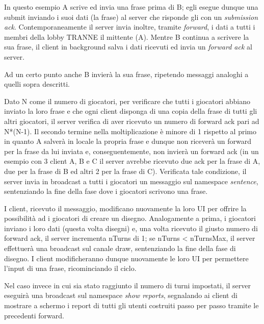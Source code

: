 \noindent In questo esempio A scrive ed invia una frase prima di B; egli esegue dunque una submit inviando i suoi dati (la frase) al server che risponde gli con un \textit{submission ack}. Contemporaneamente il server invia inoltre, tramite \textit{forward}, i dati a tutti i membri della lobby TRANNE il mittente (A). Mentre B continua a scrivere la sua frase, il client in background salva i dati ricevuti ed invia un \textit{forward ack} al server.\newline

\noindent Ad un certo punto anche B invierà la sua frase, ripetendo messaggi analoghi a quelli sopra descritti.\newline

\noindent Dato N come il numero di giocatori, per verificare che tutti i giocatori abbiano inviato la loro frase e che ogni client disponga di una copia della frase di tutti gli altri giocatori, il server verifica di aver ricevuto un numero di forward ack pari ad N*(N-1).\newline
Il secondo termine nella moltiplicazione è minore di 1 rispetto al primo in quanto A salverà in locale la propria frase e dunque non riceverà un forward per la frase da lui inviata e, conseguentemente, non invierà un forward ack (in un esempio con 3 client A, B e C il server avrebbe ricevuto due ack per la frase di A, due per la frase di B ed altri 2 per la frase di C).\newline
Verificata tale condizione, il server invia in broadcast a tutti i giocatori un messaggio sul namespace \textit{sentence}, sentenziando la fine della fase dove i giocatori scrivono una frase.\newline

\noindent I client, ricevuto il messaggio, modificano nuovamente la loro UI per offrire la possibilità ad i giocatori di creare un disegno.\newline
Analogamente a prima, i giocatori inviano i loro dati (questa volta disegni) e, una volta ricevuto il giusto numero di forward ack, il server incrementa nTurns di 1; se nTurns < nTurnsMax, il server effettuerà una broadcast sul canale draw, sentenziando la fine della fase di disegno. I client modificheranno dunque nuovamente le loro UI per permettere l'input di una frase, ricominciando il ciclo.\newline

\noindent Nel caso invece in cui sia stato raggiunto il numero di turni impostati, il server eseguirà una broadcast sul namespace \textit{show reports}, segnalando ai client di mostrare a schermo i report di tutti gli utenti costruiti passo per passo tramite le precedenti forward.\newline

